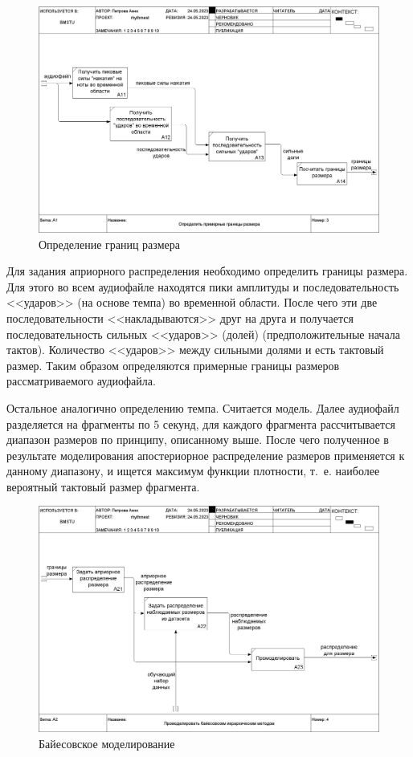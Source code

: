 \begin{figure}[h]
	\centering
	\includegraphics[scale=0.25]{inc/img/rhythm_idef/03_A1.png}
	\caption{Определение границ размера}
	\label{img:rhythm_2}
\end{figure}

\newpage

Для задания априорного распределения необходимо определить границы размера. Для этого во всем аудиофайле находятся пики амплитуды и последовательность <<ударов>> (на основе темпа) во временной области. После чего эти две последовательности <<накладываются>> друг на друга и получается последовательность сильных <<ударов>> (долей) (предположительные начала тактов). Количество <<ударов>> между сильными долями и есть тактовый размер. Таким образом определяются примерные границы размеров рассматриваемого аудиофайла.

Остальное аналогично определению темпа. Считается модель. Далее аудиофайл разделяется на фрагменты по 5 секунд, для каждого фрагмента рассчитывается диапазон размеров по принципу, описанному выше. После чего полученное в результате моделирования апостериорное распределение размеров применяется к данному диапазону, и ищется максимум функции плотности, т.~е. наиболее вероятный тактовый размер фрагмента.

\begin{figure}[h]
	\centering
	\includegraphics[scale=0.25]{inc/img/rhythm_idef/04_A2.png}
	\caption{Байесовское моделирование}
	\label{img:rhythm_3}
\end{figure}

